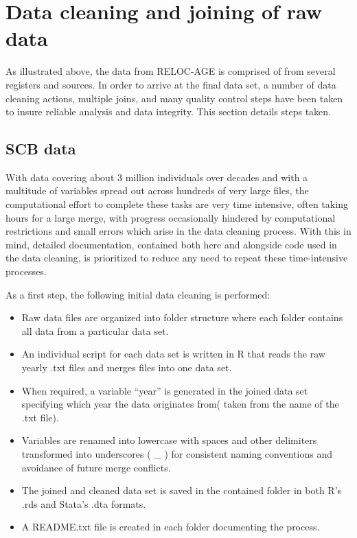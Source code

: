 \documentclass[
]{book}
\providecommand{\tightlist}{%
  \setlength{\itemsep}{0pt}\setlength{\parskip}{0pt}}
\begin{document}
\hypertarget{data-cleaning-and-joining-of-raw-data}{%
\chapter{Data cleaning and joining of raw data}\label{data-cleaning-and-joining-of-raw-data}}

As illustrated above, the data from RELOC-AGE is comprised of from several registers and sources. In order to arrive at the final data set, a number of data cleaning actions, multiple joins, and many quality control steps have been taken to insure reliable analysis and data integrity. This section details steps taken.

\hypertarget{scb-data}{%
\section{SCB data}\label{scb-data}}

With data covering about 3 million individuals over decades and with a multitude of variables spread out across hundreds of very large files, the computational effort to complete these tasks are very time intensive, often taking hours for a large merge, with progress occasionally hindered by computational restrictions and small errors which arise in the data cleaning process. With this in mind, detailed documentation, contained both here and alongside code used in the data cleaning, is prioritized to reduce any need to repeat these time-intensive processes.

As a first step, the following initial data cleaning is performed:

\begin{itemize}
\tightlist
\item
  Raw data files are organized into folder structure where each folder contains all data from a particular data set.
\item
  An individual script for each data set is written in R that reads the raw yearly .txt files and merges files into one data set.
\item
  When required, a variable ``year'' is generated in the joined data set specifying which year the data originates from( taken from the name of the .txt file).
\item
  Variables are renamed into lowercase with spaces and other delimiters transformed into underscores ( \_ ) for consistent naming conventions and avoidance of future merge conflicts.
\item
  The joined and cleaned data set is saved in the contained folder in both R's .rds and Stata's .dta formats.
\item
  A README.txt file is created in each folder documenting the process.
\end{itemize}
\end{document}

